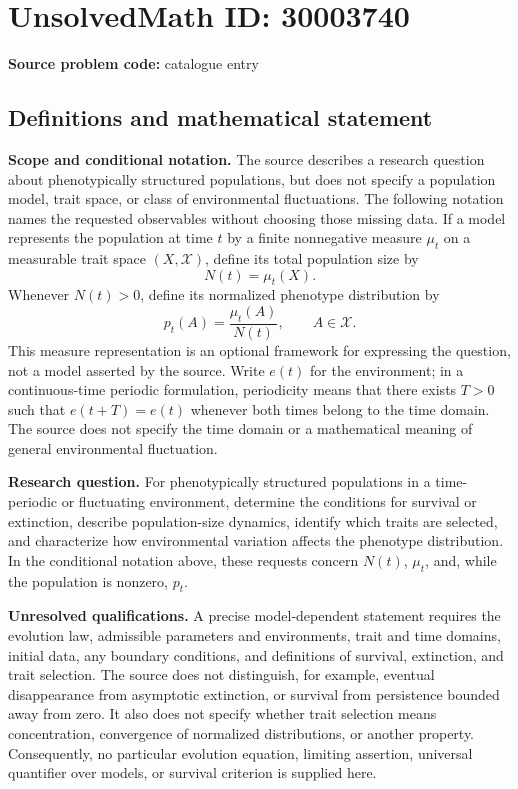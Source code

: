 \documentclass[11pt]{article}
\begin{document}
\section*{UnsolvedMath ID: 30003740}
\textbf{Source problem code:} catalogue entry
\subsection{Definitions and mathematical statement}
\textbf{Scope and conditional notation.} The source describes a research question about phenotypically structured populations, but does not specify a population model, trait space, or class of environmental fluctuations. The following notation names the requested observables without choosing those missing data. If a model represents the population at time \(t\) by a finite nonnegative measure \(\mu_t\) on a measurable trait space \((X,\mathcal X)\), define its total population size by
\[
N(t)=\mu_t(X).
\]
Whenever \(N(t)>0\), define its normalized phenotype distribution by
\[
p_t(A)=\frac{\mu_t(A)}{N(t)},\qquad A\in\mathcal X.
\]
This measure representation is an optional framework for expressing the question, not a model asserted by the source. Write \(e(t)\) for the environment; in a continuous-time periodic formulation, periodicity means that there exists \(T>0\) such that \(e(t+T)=e(t)\) whenever both times belong to the time domain. The source does not specify the time domain or a mathematical meaning of general environmental fluctuation.

\textbf{Research question.} For phenotypically structured populations in a time-periodic or fluctuating environment, determine the conditions for survival or extinction, describe population-size dynamics, identify which traits are selected, and characterize how environmental variation affects the phenotype distribution. In the conditional notation above, these requests concern \(N(t)\), \(\mu_t\), and, while the population is nonzero, \(p_t\).

\textbf{Unresolved qualifications.} A precise model-dependent statement requires the evolution law, admissible parameters and environments, trait and time domains, initial data, any boundary conditions, and definitions of survival, extinction, and trait selection. The source does not distinguish, for example, eventual disappearance from asymptotic extinction, or survival from persistence bounded away from zero. It also does not specify whether trait selection means concentration, convergence of normalized distributions, or another property. Consequently, no particular evolution equation, limiting assertion, universal quantifier over models, or survival criterion is supplied here.
\end{document}
